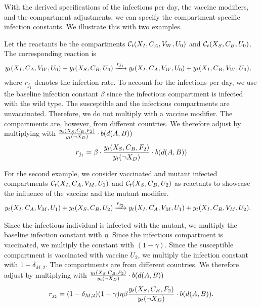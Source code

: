 With the derived specifications of the infections per day, the vaccine modifiers, and the compartment adjustments, we can specify the compartment-specific infection constants. We illustrate this with two examples. 

\begin{example}
Let the reactants be the compartments $\mathcal{C}_t(X_{I}, C_A, V_W, U_0)$ and $\mathcal{C}_t(X_{S}, C_B, U_0)$. The corresponding reaction is
\begin{align}
y_t(X_{I}, C_A, V_W, U_0) + y_t(X_{S}, C_B, U_0) &\xrightarrow{ r_{j_1}} y_t(X_{I}, C_A, V_W, U_0) + y_t(X_{I}, C_B, V_W, U_0),
\end{align}
where $r_{j_1}$ denotes the infection rate. To account for the infections per day, we use the baseline infection constant $\beta$ since the infectious compartment is infected with the wild type. The susceptible and the infectious compartments are unvaccinated. Therefore, we do not multiply with a vaccine modifier. The compartments are, however, from different countries. We therefore adjust by multiplying with $\frac{y_t(X_S, C_B, F_2)}{y_t(\neg X_D)} \cdot b(d(A, B))$
\begin{align}
r_{j_1} = \beta \cdot \frac{y_t(X_S, C_B, F_2)}{y_t(\neg X_D)} \cdot b(d(A, B))
\end{align}
\end{example}

\begin{example}
For the second example, we consider vaccinated and mutant infected compartments $\mathcal{C}_t(X_{I}, C_A, V_M, U_1)$ and $\mathcal{C}_t(X_{S}, C_B, U_2)$ as reactants to showcase the influence of the vaccine and the mutant modifier. 
\begin{align}
y_t(X_{I}, C_A, V_M, U_1) + y_t(X_{S}, C_B, U_2) &\xrightarrow{ r_{j_2}} y_t(X_{I}, C_A, V_M, U_1) + y_t(X_{I}, C_B, V_M, U_2).
\end{align}

Since the infectious individual is infected with the mutant, we multiply the baseline infection constant with $\eta$. Since the infectious compartment is vaccinated, we multiply the constant with $(1-\gamma)$. Since the susceptible compartment is vaccinated with vaccine $U_2$, we multiply the infection constant with $1-\delta_{M,2}$. The compartments are from different countries. We therefore adjust by multiplying with $\frac{y_t(X_S, C_B, F_2)}{y_t(\neg X_D)} \cdot b(d(A, B))$
\begin{align}
r_{j_2} = (1-\delta_{M,2}) (1-\gamma) \eta \beta  \frac{y_t(X_S, C_B, F_2)}{y_t(\neg X_D)} \cdot b(d(A, B)).
\end{align}
\end{example}

